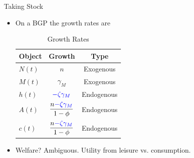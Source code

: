 \documentclass[usenames,dvipsnames]{beamer}
\begin{document}
\begin{frame}{Taking Stock}
\begin{itemize}
    \item On a BGP the growth rates are \\ \vspace{0.5cm}
    \begin{table}[htb]
        \centering
        \begin{tabular}{lcc} \hline
             Object & Growth & Type \\
             \hline\hline
             $N(t)$ & $n$ & Exogenous \\ 
             $M(t)$ & $\gamma_M$ & Exogenous \\ 
             $h(t)$ & $\textcolor{blue}{-\zeta \gamma_M}$ & Endogenous \\ 
             $A(t)$ & $\dfrac{n\textcolor{blue}{-\zeta\gamma_M}}{1-\phi}$ & Endogenous \\ 
             $c(t)$ &  $\dfrac{n\textcolor{blue}{-\zeta\gamma_M}}{1-\phi}$ & Endogenous \\ 
             \hline\hline
        \end{tabular}
        \caption{Growth Rates}
    \end{table}
    \item Welfare? Ambiguous. Utility from leisure vs. consumption. 
    \end{itemize}
\end{frame}
\end{document}

